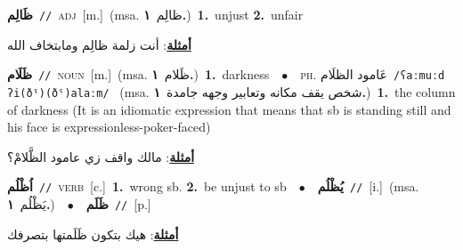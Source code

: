 \documentclass[10pt,a4paper,twoside]{article} %
\begin{document}
\begin{multicols}{2}
{{{{\setlength\topsep{0pt}\textbf{\foreignlanguage{arabic}{ظَالِم}}\ {\color{gray}\texttt{//}\color{black}}\ \textsc{adj}\ [m.]\ \color{gray}(msa. \foreignlanguage{arabic}{ظالِم}~\foreignlanguage{arabic}{\textbf{١.}})\color{black}\ \textbf{1.}~unjust  \textbf{2.}~unfair\  \begin{flushright}\color{gray}\foreignlanguage{arabic}{\textbf{\underline{\foreignlanguage{arabic}{أمثلة}}}: أنت زلمة ظالِم ومابتخاف الله}\end{flushright}\color{black}} \vspace{2mm}

{\setlength\topsep{0pt}\textbf{\foreignlanguage{arabic}{ظَلَام}}\ {\color{gray}\texttt{//}\color{black}}\ \textsc{noun}\ [m.]\ \color{gray}(msa. \foreignlanguage{arabic}{ظَلام}~\foreignlanguage{arabic}{\textbf{١.}})\color{black}\ \textbf{1.}~darkness\ \ $\bullet$\ \ \textsc{ph.} \color{gray} \foreignlanguage{arabic}{عَامود الظلَام}\color{black}\ {\color{gray}\texttt{/{\sffamily ʕaːmuːd ʔi(ðˤ)(ðˤ)alaːm}/}\color{black}}\ \color{gray} (msa. \foreignlanguage{arabic}{شخص يقف مكانه وتعابير وجهه جامدة}~\foreignlanguage{arabic}{\textbf{١.}})\color{black}\ \textbf{1.}~the column of darkness (It is an idiomatic expression that means that sb is standing still and his face is expressionless-poker-faced)\  \begin{flushright}\color{gray}\foreignlanguage{arabic}{\textbf{\underline{\foreignlanguage{arabic}{أمثلة}}}: مالك واقف زي عامود الظَّلامْ؟}\end{flushright}\color{black}} \vspace{2mm}

{\setlength\topsep{0pt}\textbf{\foreignlanguage{arabic}{اُظْلُم}}\ {\color{gray}\texttt{//}\color{black}}\ \textsc{verb}\ [c.]\ \textbf{1.}~wrong sb.  \textbf{2.}~be unjust to sb\ \ $\bullet$\ \ \setlength\topsep{0pt}\textbf{\foreignlanguage{arabic}{يُظْلُم}}\ {\color{gray}\texttt{//}\color{black}}\ [i.]\ \color{gray}(msa. \foreignlanguage{arabic}{يَظْلُم}~\foreignlanguage{arabic}{\textbf{١.}})\color{black}\ \ $\bullet$\ \ \setlength\topsep{0pt}\textbf{\foreignlanguage{arabic}{ظَلَم}}\ {\color{gray}\texttt{//}\color{black}}\ [p.]\  \begin{flushright}\color{gray}\foreignlanguage{arabic}{\textbf{\underline{\foreignlanguage{arabic}{أمثلة}}}: هيك بتكون ظَلَمتها بتصرفك}\end{flushright}\color{black}} \vspace{2mm}

}}}
\end{multicols}
\end{document}
